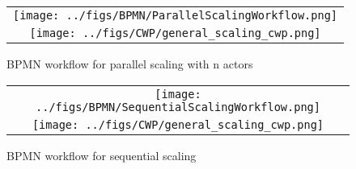 \begin{figure*}[t]
  \begin{center}
    \begin{tabular}{c}
        \texttt{[image: ../figs/BPMN/ParallelScalingWorkflow.png]} \\ 
        \texttt{[image: ../figs/CWP/general\_scaling\_cwp.png]}
    \end{tabular}
  \end{center}
\caption{BPMN workflow for parallel scaling with n actors}
\label{fig:ParallelScaling}
\end{figure*}


\begin{figure*}[t]
  \begin{center}
    \begin{tabular}{c}
        \texttt{[image: ../figs/BPMN/SequentialScalingWorkflow.png]} \\
        \texttt{[image: ../figs/CWP/general\_scaling\_cwp.png]}
    \end{tabular}
  \end{center}
\caption{BPMN workflow for sequential scaling}
\label{fig:SequentialScaling}
\end{figure*}
